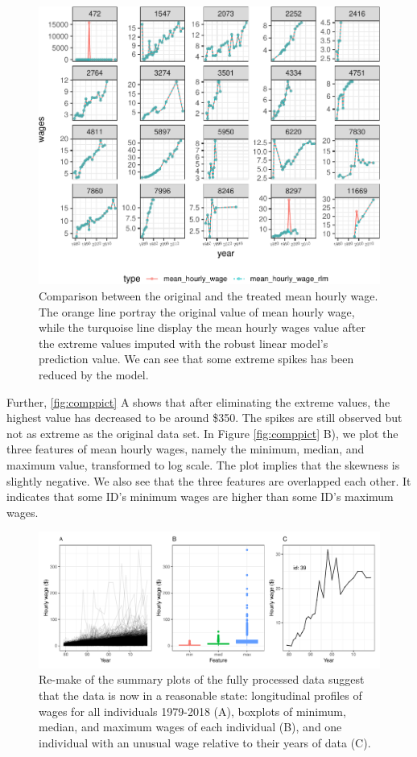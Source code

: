 \documentclass[12pt]{article}
\begin{document}
\begin{figure}

{\centering \includegraphics[width=432px]{figures/compare-plot-1} 

}

\caption{Comparison between the original and the treated mean hourly wage. The orange line portray the original value of mean hourly wage, while the turquoise line display the mean hourly wages value after the extreme values imputed with the robust linear model's prediction value. We can see that some extreme spikes has been reduced by the model.}\label{fig:compare-plot}
\end{figure}

Further, \ref{fig:comppict} A shows that after eliminating the extreme values, the highest value has decreased to be around \$350. The spikes are still observed but not as extreme as the original data set. In Figure \ref{fig:comppict} B), we plot the three features of mean hourly wages, namely the minimum, median, and maximum value, transformed to log scale. The plot implies that the skewness is slightly negative. We also see that the three features are overlapped each other. It indicates that some ID's minimum wages are higher than some ID's maximum wages.

\begin{figure}

{\centering \includegraphics[width=432px]{figures/fixed-feature-plot-1} 

}

\caption{Re-make of the summary plots of the fully processed data suggest that the data is now in a reasonable state: longitudinal profiles of wages for all individuals 1979-2018 (A), boxplots of minimum, median, and maximum wages of each individual (B), and one individual with an unusual wage relative to their years of data (C). }\label{fig:fixed-feature-plot}
\end{figure}
\end{document}
